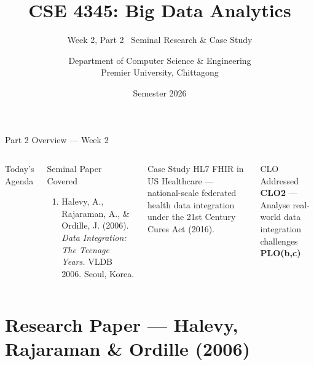 \documentclass[aspectratio=169,10pt]{beamer}
\title[CSE 4345 \textbar{} Week 2, Part 2]{CSE 4345: Big Data Analytics}
\subtitle{Week 2, Part 2 \textemdash\ Seminal Research \& Case Study}
\author[Dept.\ of CSE]{Department of Computer Science \& Engineering\\[4pt]
       \small Premier University, Chittagong}
\institute{}
\date{Semester 2026}
\begin{document}

\begin{frame}
  \titlepage
\end{frame}

\begin{frame}{Part 2 Overview — Week 2}
  \begin{columns}[T]
      \begin{block}{Today's Agenda}
        \tableofcontents
      \end{block}

      \begin{exampleblock}{Seminal Paper Covered}
        \begin{enumerate}
          \item Halevy, A., Rajaraman, A., \& Ordille, J. (2006).
                \textit{Data Integration: The Teenage Years.}
                VLDB 2006. Seoul, Korea.
        \end{enumerate}
      \end{exampleblock}
      \vspace{6pt}
      \begin{alertblock}{Case Study}
        HL7 FHIR in US Healthcare — national-scale federated health
        data integration under the 21st Century Cures Act (2016).
      \end{alertblock}
      \vspace{4pt}
      \begin{block}{CLO Addressed}
        \textbf{CLO2} — Analyse real-world data integration challenges\\
        \textbf{PLO(b,c)}
      \end{block}
  \end{columns}
\end{frame}

\section{Research Paper — Halevy, Rajaraman \& Ordille (2006)}
\end{document}
